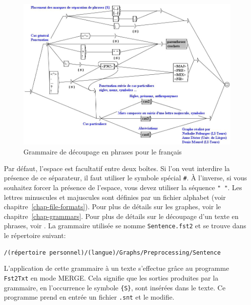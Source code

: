 \begin{figure}[!h]
\begin{center}
\includegraphics[width=15cm]{resources/img/fig2-10.png}
\caption{Grammaire de découpage en phrases pour le français
\label{fig-example-sentence-splitting}}
\end{center}
\end{figure}

\bigskip
\noindent Par défaut, l’espace est facultatif entre deux boîtes. Si l’on veut interdire la présence
de ce séparateur, il faut utiliser le symbole spécial \verb+#+. À l’inverse, si vous souhaitez
forcer la présence de l’espace, vous devez utiliser la séquence \verb+" "+. Les lettres minuscules
et majuscules sont définies par un fichier alphabet
(voir chapitre~\ref{chap-file-formats}). Pour plus de détails sur les graphes,
voir le chapitre~\ref{chap-grammars}. Pour plus de détails sur le découpage d’un texte en phrases,
voir \cite{ameliorer-decoupage-en-phrases}. La grammaire utilisée se nomme \verb+Sentence.fst2+ et
se trouve dans le répertoire suivant:

\bigskip
\verb+/(répertoire personnel)/(langue)/Graphs/Preprocessing/Sentence+

\bigskip
\noindent L’application de cette grammaire à un texte s’effectue grâce au programme \verb+Fst2Txt+
 en mode MERGE. 
Cela signifie que les sorties produites par la grammaire, en l’occurrence le symbole \verb+{S}+,
sont insérées dans le texte. Ce programme prend en entrée un fichier \verb+.snt+ et le modifie.


